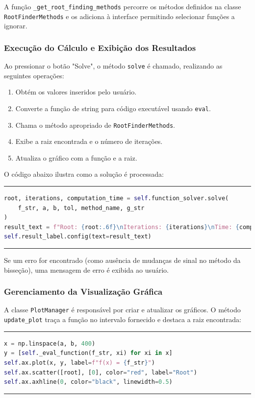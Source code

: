 A função \texttt{\_get\_root\_finding\_methods} percorre os métodos definidos na
classe \texttt{RootFinderMethods} e os adiciona à interface permitindo
selecionar funções a ignorar.

\subsubsection{Execução do Cálculo e Exibição dos Resultados}

Ao pressionar o botão "Solve", o método \texttt{solve} é chamado, realizando as
seguintes operações:
\begin{enumerate}
	\item Obtém os valores inseridos pelo usuário.
	\item Converte a função de string para código executável usando
	      \texttt{eval}.
	\item Chama o método apropriado de \texttt{RootFinderMethods}.
	\item Exibe a raiz encontrada e o número de iterações.
	\item Atualiza o gráfico com a função e a raiz.
\end{enumerate}

O código abaixo ilustra como a solução é processada:

\hrule
\lstset{style=mystyle}
\begin{lstlisting}[language=Python]
root, iterations, computation_time = self.function_solver.solve(
    f_str, a, b, tol, method_name, g_str
)
result_text = f"Root: {root:.6f}\nIterations: {iterations}\nTime: {computation_time:.6f} s"
self.result_label.config(text=result_text)
\end{lstlisting}
\hrule

Se um erro for encontrado (como ausência de mudanças de sinal no método da
bisseção), uma mensagem de erro é exibida ao usuário.

\subsubsection{Gerenciamento da Visualização Gráfica}

A classe \texttt{PlotManager} é responsável por criar e atualizar os gráficos. O
método \texttt{update\_plot} traça a função no intervalo fornecido e destaca a
raiz encontrada:

\hrule
\lstset{style=mystyle}
\begin{lstlisting}[language=Python]
x = np.linspace(a, b, 400)
y = [self._eval_function(f_str, xi) for xi in x]
self.ax.plot(x, y, label=f"f(x) = {f_str}")
self.ax.scatter([root], [0], color="red", label="Root")
self.ax.axhline(0, color="black", linewidth=0.5)
\end{lstlisting}
\hrule

